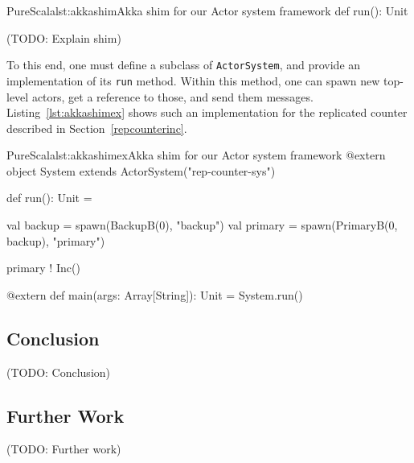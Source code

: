 \documentclass[a4paper,twoside]{article}
\newcommand{\TODO}[1]{\textcolor{YellowOrange}{(TODO: #1)}} %
\newcommand{\RefSec}[1]{Section~\ref{#1}}
\newcommand{\RefCode}[1]{Listing~\ref{#1}}
\newcommand{\stt}[1]{\texttt{\small{#1}}}
\begin{document}
\begin{enumerate}
\begin{Code}{PureScala}{lst:akkashim}{Akka shim for our Actor system framework}
{  def run(): Unit
}
\end{Code}

\TODO{Explain shim}

To this end, one must define a subclass of \stt{ActorSystem}, and provide an implementation of its \stt{run} method. Within this method, one can spawn new top-level actors, get a reference to those, and send them messages. \RefCode{lst:akkashimex} shows such an implementation for the replicated counter described in \RefSec{repcounterinc}. 

\begin{Code}{PureScala}{lst:akkashimex}{Akka shim for our Actor system framework}
@extern
object System extends ActorSystem("rep-counter-sys") {
  def run(): Unit = {
    val backup  = spawn(BackupB(0), "backup")
    val primary = spawn(PrimaryB(0, backup), "primary")

    primary ! Inc()
  }
}

@extern
def main(args: Array[String]): Unit = {
  System.run()
}
\end{Code}

\subsection{Conclusion}

\TODO{Conclusion}

\subsection{Further Work}

\TODO{Further work}


\end{enumerate}
\end{document}
